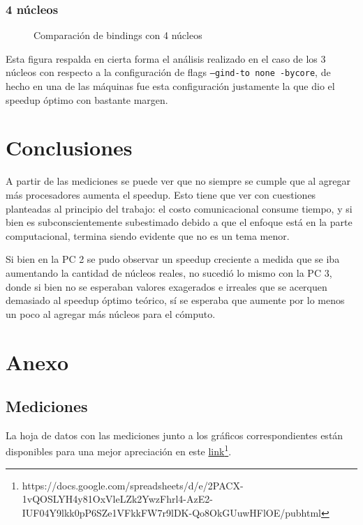\documentclass{article}
\begin{document}
\subsubsection{4 núcleos}
\begin{figure}[H]
    
    \caption{Comparación de bindings con 4 núcleos}
\end{figure}
Esta figura respalda en cierta forma el análisis realizado en el caso de los 3 núcleos con respecto a la configuración de flags \texttt{--gind-to none -bycore}, de hecho en una de las máquinas fue esta configuración justamente la que dio el speedup óptimo con bastante margen.

\newpage
\section{Conclusiones}
A partir de las mediciones se puede ver que no siempre se cumple que al agregar más procesadores aumenta el speedup. Esto tiene que ver con cuestiones planteadas al principio del trabajo: el costo comunicacional consume tiempo, y si bien es subconscientemente subestimado debido a que el enfoque está en la parte computacional, termina siendo evidente que no es un tema menor. 

Si bien en la PC 2 se pudo observar un speedup creciente a medida que se iba aumentando la cantidad de núcleos reales, no sucedió lo mismo con la PC 3, donde si bien no se esperaban valores exagerados e irreales que se acerquen demasiado al speedup óptimo teórico, sí se esperaba que aumente por lo menos un poco al agregar más núcleos para el cómputo.

\newpage
\section{Anexo}
\subsection{Mediciones}
La hoja de datos con las mediciones junto a los gráficos correspondientes están disponibles para una mejor apreciación en este \href{https://docs.google.com/spreadsheets/d/e/2PACX-1vQOSLYH4y81OxVleLZk2YwzFhrl4-AzE2-IUF04Y9lkk0pP6SZe1VFkkFW7r9lDK-Qo8OkGUuwHFlOE/pubhtml}{link}\footnote{https://docs.google.com/spreadsheets/d/e/2PACX-1vQOSLYH4y81OxVleLZk2YwzFhrl4-AzE2-IUF04Y9lkk0pP6SZe1VFkkFW7r9lDK-Qo8OkGUuwHFlOE/pubhtml}. 
\end{document}
